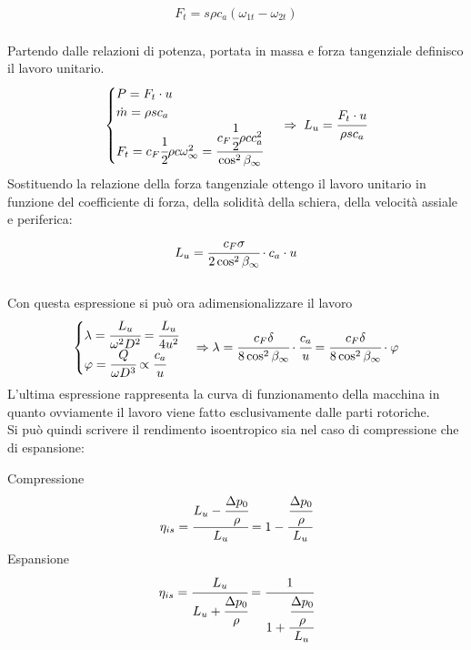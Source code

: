 \begin{align*}
F_t = s \rho c_a (\omega_{1t} - \omega_{2t})
\end{align*}
\\Partendo dalle relazioni di potenza, portata in massa e forza tangenziale definisco il lavoro unitario.
\begin{align*}
\begin{cases}
P=F_t \cdot u\\
\dot{m} = \rho s c_a\\
F_t = c_F \cfrac{1}{2} \rho c \omega_{\infty}^2 = \cfrac{c_F \cfrac{1}{2} \rho c c_a^2}{\cos^2 \beta_{\infty}}
\end{cases} \;
\Rightarrow \;
L_u = \cfrac{F_t \cdot u}{\rho s c_a}
\end{align*}
Sostituendo la relazione della forza tangenziale ottengo il lavoro unitario in funzione del coefficiente di forza, della solidità della schiera, della velocità assiale e periferica:
\begin{align*}
L_u = \cfrac{c_F \sigma}{2 \cos^2 \beta_{\infty}} \cdot c_a \cdot u
\end{align*}
\\Con questa espressione si può ora adimensionalizzare il lavoro
\begin{align*}
\begin{cases}
\lambda = \cfrac{L_u}{\omega ^2 D^2} = \cfrac{L_u}{4 u^2}\\
\varphi = \cfrac{Q}{\omega D^3} \propto \cfrac{c_a}{u}
\end{cases}
\Rightarrow
\lambda = \cfrac{c_F \delta}{8 \cos^2 \beta_{\infty}} \cdot \cfrac{c_a}{u} = \cfrac{c_F \delta}{8 \cos^2 \beta_{\infty}} \cdot \varphi
\end{align*}
L'ultima espressione rappresenta la curva di funzionamento della macchina in quanto ovviamente il lavoro viene fatto esclusivamente dalle parti rotoriche.\\
Si può quindi scrivere il rendimento isoentropico sia nel caso di compressione che di espansione:
\begin{multicols}{2}
Compressione
\begin{align*}
\eta_{is} = \cfrac{L_u - \cfrac{\Delta p_0}{\rho}}{L_u} = 1- \cfrac{\cfrac{\Delta p_0}{\rho}}{L_u}
\end{align*}
\break
Espansione
\begin{align*}
\eta_{is} = \cfrac{L_u}{L_u + \cfrac{\Delta p_0}{\rho}} = \cfrac{1}{1+\cfrac{\cfrac{\Delta p_0}{\rho}}{L_u}}
\end{align*}
\end{multicols}
